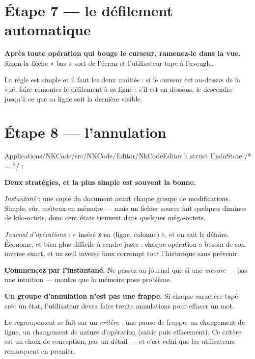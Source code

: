 \section{Étape 7 --- le défilement automatique}

\begin{nkretenir}
\textbf{Après toute opération qui bouge le curseur, ramenez-le dans la vue.}
Sinon la flèche « bas » sort de l'écran et l'utilisateur tape à l'aveugle.

La règle est simple et il faut les deux moitiés : si le curseur est au-dessus de
la vue, faire remonter le défilement à sa ligne ; s'il est en dessous, le
descendre jusqu'à ce que sa ligne soit la dernière visible.
\end{nkretenir}

\section{Étape 8 --- l'annulation}

\begin{nkcode}{Applications/NKCode/src/NKCode/Editor/NkCodeEditor.h}
struct UndoState { /* ... */ };
\end{nkcode}

\begin{nkretenir}
\textbf{Deux stratégies, et la plus simple est souvent la bonne.}

\emph{Instantané} : une copie du document avant chaque groupe de modifications.
Simple, sûr, coûteux en mémoire --- mais un fichier source fait quelques dizaines
de kilo-octets, donc cent états tiennent dans quelques méga-octets.

\emph{Journal d'opérations} : « inséré \texttt{x} en (ligne, colonne) », et on
sait le défaire. Économe, et bien plus difficile à rendre juste : chaque
opération a besoin de son inverse exact, et un seul inverse faux corrompt tout
l'historique sans prévenir.

\textbf{Commencez par l'instantané.} Ne passez au journal que si une
\emph{mesure} --- pas une intuition --- montre que la mémoire pose problème.
\end{nkretenir}

\begin{nkpiege}
\textbf{Un groupe d'annulation n'est pas une frappe.} Si chaque caractère tapé
crée un état, l'utilisateur devra faire trente annulations pour effacer un mot.

Le regroupement se fait sur un \emph{critère} : une pause de frappe, un
changement de ligne, un changement de nature d'opération (saisie puis
effacement). Ce critère est un choix de conception, pas un détail --- et c'est
celui que les utilisateurs remarquent en premier.
\end{nkpiege}

